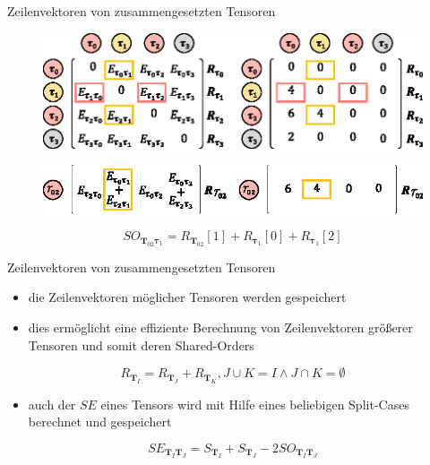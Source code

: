 \documentclass{beamer}
\begin{document}
\begin{frame}{Zeilenvektoren von zusammengesetzten Tensoren}
	\begin{figure}
		\includegraphics[scale=.9]{figure_05_a_c}
	\end{figure} \pause
	\begin{figure}
		\includegraphics[scale=1.1]{figure_05_b_d}
	\end{figure} \pause
	\begin{equation*}
		SO_{\bm{T}_{02} \bm{\tau}_1} = R_{\bm{T}_{02}}[1] + R_{\bm{\tau}_1}[0] + R_{\bm{\tau}_1}[2]
	\end{equation*}
\end{frame}

\begin{frame}{Zeilenvektoren von zusammengesetzten Tensoren}
	\begin{itemize}
		\item die Zeilenvektoren möglicher Tensoren werden gespeichert
		\item dies ermöglicht eine effiziente Berechnung von Zeilenvektoren größerer Tensoren und somit deren Shared-Orders
	\end{itemize}
	\begin{equation*}
		R_{\bm{T}_I} = R_{\bm{T}_J} + R_{\bm{T}_K}, J \cup K = I \wedge J \cap K = \emptyset
	\end{equation*} \pause
	\begin{itemize}
		\item auch der $SE$ eines Tensors wird mit Hilfe eines beliebigen Split-Cases berechnet und gespeichert
	\end{itemize}
	\begin{equation*}
		SE_{\bm{T}_I \bm{T}_J} = S_{\bm{T}_{I}} + S_{\bm{T}_{J}} - 2SO_{\bm{T}_I \bm{T}_J}
	\end{equation*}
\end{frame}
\end{document}
